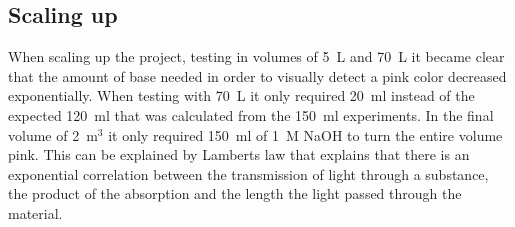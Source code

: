 \subsection{Scaling up}
When scaling up the project, testing in volumes of 5~L and 70~L it became clear
that the amount of base needed in order to visually detect a pink color
decreased exponentially. When testing with 70~L it only required 20~ml instead of
the expected 120~ml that was calculated from the 150~ml experiments. In the final
volume of 2~m$^3$ it only required 150~ml of 1~M NaOH to turn the entire volume
pink.  This can be explained by Lamberts law that explains that there is an
exponential correlation between the transmission of light through a substance,
the product of the absorption and the length the light passed through the
material.


